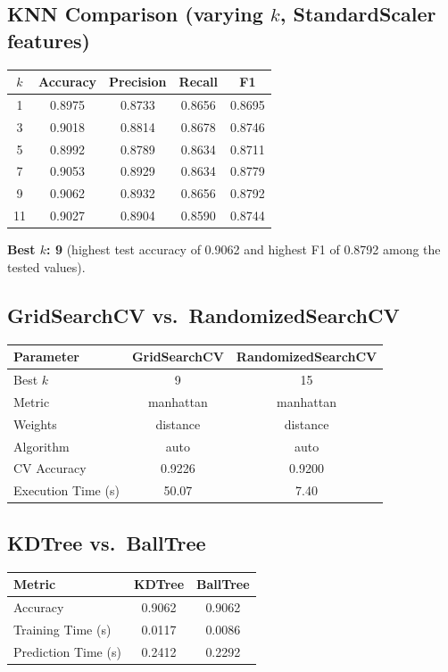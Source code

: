 \documentclass[12pt,a4paper]{article}
\begin{document}
\subsection*{KNN Comparison (varying $k$, StandardScaler features)}
\begin{tabular}{ccccc}
\toprule
$k$ & Accuracy & Precision & Recall & F1 \\
\midrule
1  & 0.8975 & 0.8733 & 0.8656 & 0.8695 \\
3  & 0.9018 & 0.8814 & 0.8678 & 0.8746 \\
5  & 0.8992 & 0.8789 & 0.8634 & 0.8711 \\
7  & 0.9053 & 0.8929 & 0.8634 & 0.8779 \\
9  & 0.9062 & 0.8932 & 0.8656 & 0.8792 \\
11 & 0.9027 & 0.8904 & 0.8590 & 0.8744 \\
\bottomrule
\end{tabular}

\textbf{Best $k$: 9} (highest test accuracy of 0.9062 and highest F1 of 0.8792 among
the tested values).

\subsection*{GridSearchCV vs.\ RandomizedSearchCV}
\begin{tabular}{lcc}
\toprule
Parameter & GridSearchCV & RandomizedSearchCV \\
\midrule
Best $k$      & 9         & 15 \\
Metric        & manhattan & manhattan \\
Weights       & distance  & distance \\
Algorithm     & auto      & auto \\
CV Accuracy   & 0.9226    & 0.9200 \\
Execution Time (s) & 50.07 & 7.40 \\
\bottomrule
\end{tabular}

\subsection*{KDTree vs.\ BallTree}
\begin{tabular}{lcc}
\toprule
Metric & KDTree & BallTree \\
\midrule
Accuracy         & 0.9062  & 0.9062 \\
Training Time (s) & 0.0117 & 0.0086 \\
Prediction Time (s) & 0.2412 & 0.2292 \\
\bottomrule
\end{tabular}
\end{document}

